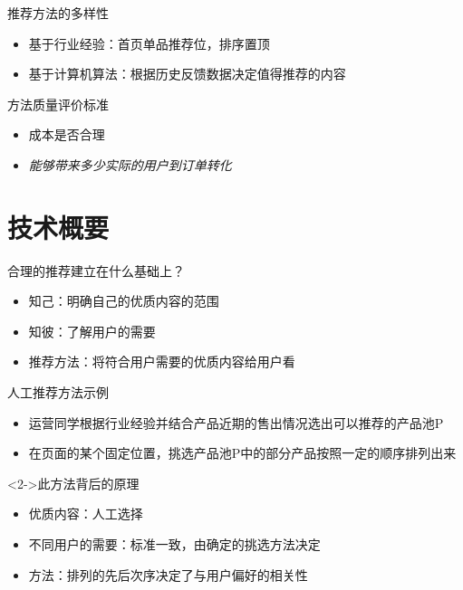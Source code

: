 \documentclass{beamer}
\begin{document}
\begin{CJK}{UTF8}{gbsn}
\begin{frame}{推荐方法的多样性}
  \begin{itemize}
  \item {基于行业经验：首页单品推荐位，排序置顶}
  \item {基于计算机算法：根据历史反馈数据决定值得推荐的内容}
  \end{itemize}
\end{frame}

\begin{frame}{方法质量评价标准}
  \begin{itemize}
    \item {成本是否合理}
    \item {\emph{能够带来多少实际的用户到订单转化}}
  \end{itemize}
\end{frame}

\section{技术概要}


\begin{frame}{合理的推荐建立在什么基础上？}
  \begin{itemize}
  \item {知己：明确自己的优质内容的范围}
  \item {知彼：了解用户的需要}
  \item {推荐方法：将符合用户需要的优质内容给用户看}
  \end{itemize}
\end{frame}

\begin{frame}{人工推荐方法示例}
  \begin{itemize}
  \item {运营同学根据行业经验并结合产品近期的售出情况选出可以推荐的产品池P}
  \item {在页面的某个固定位置，挑选产品池P中的部分产品按照一定的顺序排列出来}
  \end{itemize}
  \begin{block}<2->{此方法背后的原理}
    \begin{itemize}
    \item {优质内容：人工选择}
    \item {不同用户的需要：标准一致，由确定的挑选方法决定}
    \item {方法：排列的先后次序决定了与用户偏好的相关性}
    \end{itemize}
  \end{block}
\end{frame}



\end{CJK}
\end{document}
